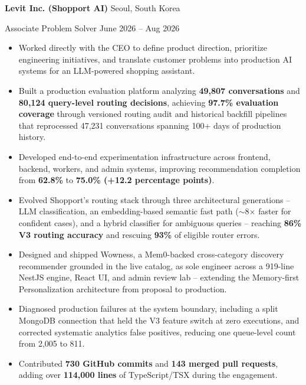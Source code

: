 \documentclass[11pt,a4paper]{article}
\begin{document}
\textbf{Levit Inc. (Shopport AI)} \hfill Seoul, South Korea

Associate Problem Solver \hfill June 2026 -- Aug 2026

\begin{itemize}[leftmargin=1.5em]

\item Worked directly with the CEO to define product direction, prioritize engineering initiatives, and translate customer problems into production AI systems for an LLM-powered shopping assistant.

\item Built a production evaluation platform analyzing \textbf{49,807 conversations} and \textbf{80,124 query-level routing decisions}, achieving \textbf{97.7\% evaluation coverage} through versioned routing audit and historical backfill pipelines that reprocessed 47,231 conversations spanning 100+ days of production history.

\item Developed end-to-end experimentation infrastructure across frontend, backend, workers, and admin systems, improving recommendation completion from \textbf{62.8\%} to \textbf{75.0\% (+12.2 percentage points)}.

\item Evolved Shopport's routing stack through three architectural generations -- LLM classification, an embedding-based semantic fast path ($\sim$8$\times$ faster for confident cases), and a hybrid classifier for ambiguous queries -- reaching \textbf{86\% V3 routing accuracy} and rescuing \textbf{93\%} of eligible router errors.

\item Designed and shipped Wowness, a Mem0-backed cross-category discovery recommender grounded in the live catalog, as sole engineer across a 919-line NestJS engine, React UI, and admin review lab -- extending the Memory-first Personalization architecture from proposal to production.

\item Diagnosed production failures at the system boundary, including a split MongoDB connection that held the V3 feature switch at zero executions, and corrected systematic analytics false positives, reducing one queue-level count from 2,005 to 811.

\item Contributed \textbf{730 GitHub commits} and \textbf{143 merged pull requests}, adding over \textbf{114,000 lines} of TypeScript/TSX during the engagement.

\end{itemize}
\end{document}
